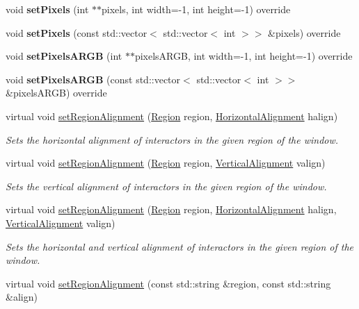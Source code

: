 \begin{DoxyCompactItemize}
\item 
void {\bfseries set\+Pixels} (int $\ast$$\ast$pixels, int width=-\/1, int height=-\/1) override
\item 
void {\bfseries set\+Pixels} (const std\+::vector$<$ std\+::vector$<$ int $>$$>$ \&pixels) override
\item 
void {\bfseries set\+Pixels\+A\+R\+GB} (int $\ast$$\ast$pixels\+A\+R\+GB, int width=-\/1, int height=-\/1) override
\item 
void {\bfseries set\+Pixels\+A\+R\+GB} (const std\+::vector$<$ std\+::vector$<$ int $>$$>$ \&pixels\+A\+R\+GB) override
\item 
virtual void \mbox{\hyperlink{classsgl_1_1GWindow_a96e9f5593c0193bbdc7ae99945b9cf5f}{set\+Region\+Alignment}} (\mbox{\hyperlink{classsgl_1_1GWindow_a81a01a86de31071a92e6cce0bab9bc4b}{Region}} region, \mbox{\hyperlink{namespacesgl_aa00e70829e72ff16addc4d9f06fe3bc5}{Horizontal\+Alignment}} halign)
\begin{DoxyCompactList}\small\item\em Sets the horizontal alignment of interactors in the given region of the window. \end{DoxyCompactList}\item 
virtual void \mbox{\hyperlink{classsgl_1_1GWindow_a926942899d029fc9921fe770ac2867bb}{set\+Region\+Alignment}} (\mbox{\hyperlink{classsgl_1_1GWindow_a81a01a86de31071a92e6cce0bab9bc4b}{Region}} region, \mbox{\hyperlink{namespacesgl_a9c2ed22cfbd21f13df24ea193b310aee}{Vertical\+Alignment}} valign)
\begin{DoxyCompactList}\small\item\em Sets the vertical alignment of interactors in the given region of the window. \end{DoxyCompactList}\item 
virtual void \mbox{\hyperlink{classsgl_1_1GWindow_ab4d2bfcca7a18da2847e7b4494da4a16}{set\+Region\+Alignment}} (\mbox{\hyperlink{classsgl_1_1GWindow_a81a01a86de31071a92e6cce0bab9bc4b}{Region}} region, \mbox{\hyperlink{namespacesgl_aa00e70829e72ff16addc4d9f06fe3bc5}{Horizontal\+Alignment}} halign, \mbox{\hyperlink{namespacesgl_a9c2ed22cfbd21f13df24ea193b310aee}{Vertical\+Alignment}} valign)
\begin{DoxyCompactList}\small\item\em Sets the horizontal and vertical alignment of interactors in the given region of the window. \end{DoxyCompactList}\item 
virtual void \mbox{\hyperlink{classsgl_1_1GWindow_ae4ff46516be9472498c0bf058b496e8b}{set\+Region\+Alignment}} (const std\+::string \&region, const std\+::string \&align)

\end{DoxyCompactItemize}
